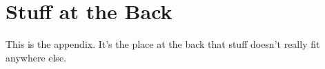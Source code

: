 \chapter{Stuff at the Back}

This is the appendix. It's the place at the back that stuff doesn't really fit anywhere else.